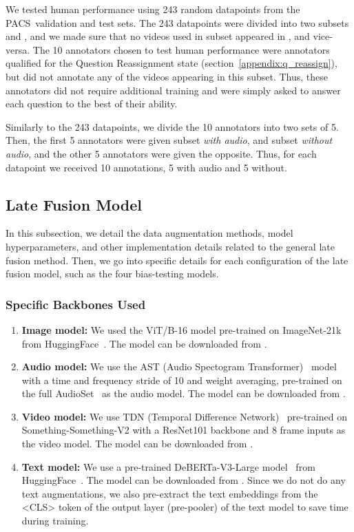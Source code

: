 \documentclass[runningheads]{llncs}
\newcommand{\names}{\textsc{PACS}}
\begin{document}
We tested human performance using 243 random datapoints from the \names\ validation and test sets. The 243 datapoints were divided into two subsets  and , and we made sure that no videos used in subset  appeared in , and vice-versa. The 10 annotators chosen to test human performance were annotators qualified for the Question Reassignment state (section~\ref{appendix:q_reassign}), but did not annotate any of the videos appearing in this subset. Thus, these annotators did not require additional training and were simply asked to answer each question to the best of their ability. 

Similarly to the 243 datapoints, we divide the 10 annotators into two sets of 5. Then, the first 5 annotators were given subset  \textit{with audio}, and subset  \textit{without audio}, and the other 5 annotators were given the opposite. Thus, for each datapoint we received 10 annotations, 5 with audio and 5 without. 

\subsection{Late Fusion Model~\cite{pandeya2021fusion}}

In this subsection, we detail the data augmentation methods, model hyperparameters, and other implementation details related to the general late fusion method. Then, we go into specific details for each configuration of the late fusion model, such as the four bias-testing models.

\subsubsection{Specific Backbones Used} 
\begin{enumerate}
    \item \textbf{Image model:} We used the ViT/B-16 model pre-trained on ImageNet-21k from HuggingFace~\cite{wolf2020huggingface}. The model can be downloaded from \href{https://huggingface.co/google/vit-base-patch16-224-in21k}{}.
    \item \textbf{Audio model:} We use the AST (Audio Spectogram Transformer)~\cite{gong2021ast} model with a time and frequency stride of 10 and weight averaging, pre-trained on the full AudioSet~\cite{gemmeke2017audioset} as the audio model. The model can be downloaded from \href{https://github.com/YuanGongND/ast}{}. 
    \item \textbf{Video model:} We use TDN (Temporal Difference Network)~\cite{wang2021tdn} pre-trained on Something-Something-V2 with a ResNet101 backbone and 8 frame inputs as the video model. The model can be downloaded from \href{https://github.com/MCG-NJU/TDN}{}. 
    \item \textbf{Text model:} We use a pre-trained DeBERTa-V3-Large model~\cite{he2021debertav3} from HuggingFace~\cite{wolf2020huggingface}. The model can be downloaded from \href{https://huggingface.co/microsoft/deberta-v3-large}{}. Since we do not do any text augmentations, we also pre-extract the text embeddings from the <CLS> token of the output layer (pre-pooler) of the text model to save time during training. 
\end{enumerate}
\end{document}
